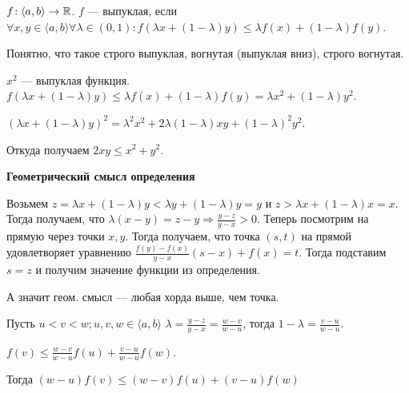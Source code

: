 \begin{definition}
    $f\!:\langle a, b \rangle \to \mathbb{R}$.  $f$ --- выпуклая, если  $\forall x, y \in \langle a, b \rangle \forall \lambda \in (0, 1)\!: f(\lambda x + (1-\lambda)y) \le \lambda f(x) + (1 - \lambda)f(y)$. 

    Понятно, что такое строго выпуклая, вогнутая (выпуклая вниз), строго вогнутая.
\end{definition}
\begin{example}
    $x^2$ --- выпуклая функция.  $f(\lambda x + (1-\lambda) y) \le \lambda f(x) + (1- \lambda)f(y) = \lambda x^2 + (1-\lambda) y^2$.

    $(\lambda x + (1-\lambda) y)^2 = \lambda^2 x^2 + 2\lambda(1-\lambda)xy + (1-\lambda)^2 y^2$.

    Откуда получаем  $2xy \le x^2 + y^2$.
\end{example}

\textbf{Геометрический смысл определения}

Возьмем $z=\lambda x + (1-\lambda)y < \lambda y + (1-\lambda)y = y$ и  $z > \lambda x + (1-\lambda) x = x$. Тогда получаем, что  $\lambda(x-y) = z-y \Rightarrow \frac{y-z}{y-x} > 0$. 
Теперь посмотрим на прямую через точки $x, y$. Тогда получаем, что точка  $(s, t)$ на прямой удовлетворяет уравнению  $\frac{f(y)-f(x)}{y-x}(s-x) + f(x) = t$. Тогда подставим $s=z$ и получим значение функции из определения.

А значит геом. смысл --- любая хорда выше, чем точка.

 \begin{definition}
     Пусть $u < v < w; u, v, w \in \langle a, b \rangle$
     $\lambda = \frac{y-z}{y-x} = \frac{w-v}{w - u}$, тогда $1 - \lambda = \frac{v-u}{w-u}$.

     $f(v) \le \frac{w-v}{w-u}f(u) + \frac{v-u}{w-u}f(w)$. 

     Тогда $(w-u)f(v) \le (w-v)f(u)+(v-u)f(w)$
\end{definition}

